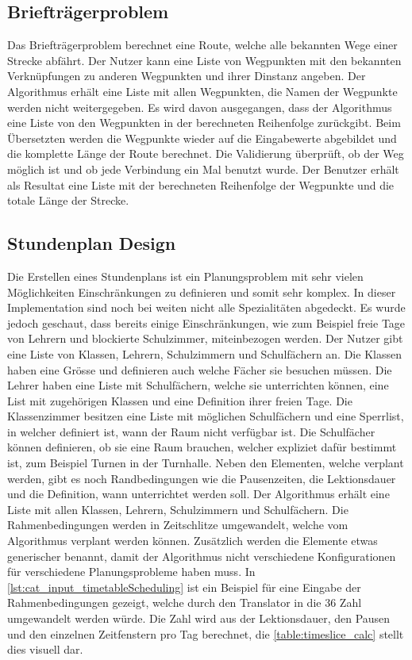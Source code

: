 \subsection{Briefträgerproblem}
Das Briefträgerproblem berechnet eine Route, welche alle bekannten Wege einer Strecke abfährt. Der Nutzer kann eine Liste von Wegpunkten mit den bekannten Verknüpfungen zu anderen 
Wegpunkten und ihrer Dinstanz angeben. Der Algorithmus erhält eine Liste mit allen Wegpunkten, die Namen der Wegpunkte werden nicht weitergegeben. Es wird davon ausgegangen, dass 
der Algorithmus eine Liste von den Wegpunkten in der berechneten Reihenfolge zurückgibt. Beim Übersetzten werden die Wegpunkte wieder auf die Eingabewerte abgebildet und die komplette 
Länge der Route berechnet. Die Validierung überprüft, ob der Weg möglich ist und ob jede Verbindung ein Mal benutzt wurde. Der Benutzer erhält als Resultat eine Liste mit der berechneten 
Reihenfolge der Wegpunkte und die totale Länge der Strecke.

%
%
%
%

\subsection{Stundenplan Design}
Die Erstellen eines Stundenplans ist ein Planungsproblem mit sehr vielen Möglichkeiten Einschränkungen zu definieren und somit sehr komplex. In dieser Implementation sind noch bei weiten 
nicht alle Spezialitäten abgedeckt. Es wurde jedoch geschaut, dass bereits einige Einschränkungen, wie zum Beispiel freie Tage von Lehrern und blockierte Schulzimmer, miteinbezogen werden. 
Der Nutzer gibt eine Liste von Klassen, Lehrern, Schulzimmern und Schulfächern an. Die Klassen haben eine Grösse und definieren auch welche Fächer sie besuchen müssen. Die Lehrer haben 
eine Liste mit Schulfächern, welche sie unterrichten können, eine List mit zugehörigen Klassen und eine Definition ihrer freien Tage. Die Klassenzimmer besitzen eine Liste mit möglichen 
Schulfächern und eine Sperrlist, in welcher definiert ist, wann der Raum nicht verfügbar ist. Die Schulfächer können definieren, ob sie eine Raum brauchen, welcher expliziet dafür 
bestimmt ist, zum Beispiel Turnen in der Turnhalle. Neben den Elementen, welche verplant werden, gibt es noch Randbedingungen wie die Pausenzeiten, die Lektionsdauer und die Definition, 
wann unterrichtet werden soll. Der Algorithmus erhält eine Liste mit allen Klassen, Lehrern, Schulzimmern und Schulfächern. Die Rahmenbedingungen werden in Zeitschlitze umgewandelt, 
welche vom Algorithmus verplant werden können. Zusätzlich werden die Elemente etwas generischer benannt, damit der Algorithmus nicht verschiedene Konfigurationen für verschiedene 
Planungsprobleme haben muss. In \autoref{lst:cat_input_timetableScheduling} ist ein Beispiel für eine Eingabe der Rahmenbedingungen gezeigt, welche durch den Translator in die 36 Zahl 
umgewandelt werden würde. Die Zahl wird aus der Lektionsdauer, den Pausen und den einzelnen Zeitfenstern pro Tag berechnet, die \autoref{table:timeslice_calc} stellt dies visuell dar.

